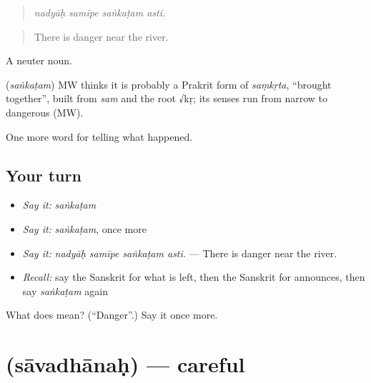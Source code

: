 \begin{quote}
   
\end{quote}

\begin{quote}
\emph{nadyāḥ samīpe saṅkaṭam asti.}
\end{quote}

\begin{quote}
There is danger near the river.
\end{quote}

A neuter noun.

\begin{cousinweb}
\textbf{} (\emph{saṅkaṭam}) MW thinks it is probably a Prakrit form of \emph{saṃkṛta}, \textquotedblleft{}brought together\textquotedblright{}, built from \emph{sam} and the root √kṛ; its senses run from narrow to dangerous (MW).
\end{cousinweb}

\begin{grammarlens}[title={What you've built}]
One more word for telling what happened.
\end{grammarlens}

\subsection*{Your turn}
\begin{itemize}
\raggedright
  \item \emph{Say it:} \emph{saṅkaṭam}
  \item \emph{Say it:} \emph{saṅkaṭam}, once more
  \item \emph{Say it:} \emph{nadyāḥ samīpe saṅkaṭam asti.} — There is danger near the river.
  \item \emph{Recall:} say the Sanskrit for what is left, then the Sanskrit for announces, then say \emph{saṅkaṭam} again
\end{itemize}

\begin{tcolorbox}[breakable,colback=teal!4,colframe=teal!35!black,title={Before you move on}]
What does  mean? (\textquotedblleft{}Danger\textquotedblright{}.) Say it once more.
\end{tcolorbox}
\section[\texorpdfstring{\sk{सावधानः} (sāvadhānaḥ)}{सावधानः (sāvadhānaḥ)}]{ (sāvadhānaḥ) — careful}

